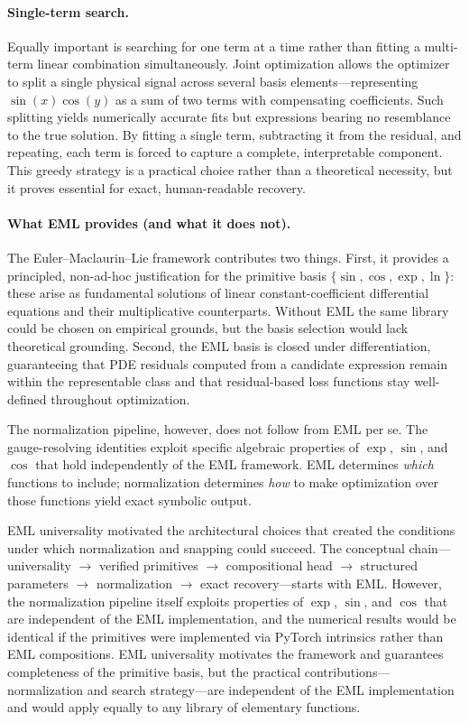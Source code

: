 \paragraph{Single-term search.}
Equally important is searching for one term at a time rather than fitting a
multi-term linear combination simultaneously.  Joint optimization allows the
optimizer to split a single physical signal across several basis
elements---representing $\sin(x)\cos(y)$ as a sum of two terms with
compensating coefficients.  Such splitting yields numerically accurate fits but
expressions bearing no resemblance to the true solution.  By fitting a single
term, subtracting it from the residual, and repeating, each term is forced to
capture a complete, interpretable component.  This greedy strategy is a
practical choice rather than a theoretical necessity, but it proves essential
for exact, human-readable recovery.

\paragraph{What EML provides (and what it does not).}
The Euler--Maclaurin--Lie framework contributes two things.  First, it provides
a principled, non-ad-hoc justification for the primitive basis
$\{\sin, \cos, \exp, \ln\}$: these arise as fundamental solutions of linear
constant-coefficient differential equations and their multiplicative
counterparts.  Without EML the same library could be chosen on empirical
grounds, but the basis selection would lack theoretical grounding.  Second, the
EML basis is closed under differentiation, guaranteeing that PDE residuals
computed from a candidate expression remain within the representable class and
that residual-based loss functions stay well-defined throughout optimization.

The normalization pipeline, however, does not follow from EML per se.  The
gauge-resolving identities exploit specific algebraic properties of $\exp$,
$\sin$, and $\cos$ that hold independently of the EML framework.  EML
determines \emph{which} functions to include; normalization determines
\emph{how} to make optimization over those functions yield exact symbolic
output.

EML universality motivated the architectural choices that created the
conditions under which normalization and snapping could succeed.  The
conceptual chain---universality $\to$ verified primitives $\to$ compositional
head $\to$ structured parameters $\to$ normalization $\to$ exact
recovery---starts with EML\@.  However, the normalization pipeline itself
exploits properties of $\exp$, $\sin$, and $\cos$ that are independent of
the EML implementation, and the numerical results would be identical if the
primitives were implemented via PyTorch intrinsics rather than EML
compositions.  EML universality motivates the framework and guarantees
completeness of the primitive basis, but the practical
contributions---normalization and search strategy---are independent of the EML
implementation and would apply equally to any library of elementary functions.

